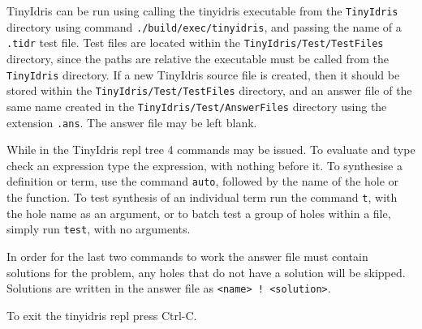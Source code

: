 \documentclass[a4paper]{article}
\begin{document}
TinyIdris can be run using calling the tinyidris executable 
from the \texttt{TinyIdris} directory using command \texttt{./build/exec/tinyidris}, and passing
the name of a \texttt{.tidr} test file. 
Test files are located within the \texttt{TinyIdris/Test/TestFiles} directory, since the paths are 
relative the executable must be called from the \texttt{TinyIdris} directory.
If a new TinyIdris source file is created, then it
should be stored within the \texttt{TinyIdris/Test/TestFiles}
directory, and an answer file of the same name created in the
\texttt{TinyIdris/Test/AnswerFiles} directory using the extension \texttt{.ans}.
The answer file may be left blank. 

While in the TinyIdris repl tree 4 commands may be issued. To evaluate
and type check an expression type the expression, with nothing before
it. To synthesise a definition or term, use the command \texttt{auto},
followed by the name of the hole or the function.
To test synthesis of an individual term run the command \texttt{t},
with the hole name as an argument, or to batch test a group of holes
within a file, simply run \texttt{test}, with no arguments.

In order for the last two commands to work the answer file must contain
solutions for the problem, any holes that do not have a solution will
be skipped. Solutions are written in the answer file as
\texttt{<name> ! <solution>}.

To exit the tinyidris repl press Ctrl-C.
\end{document}

